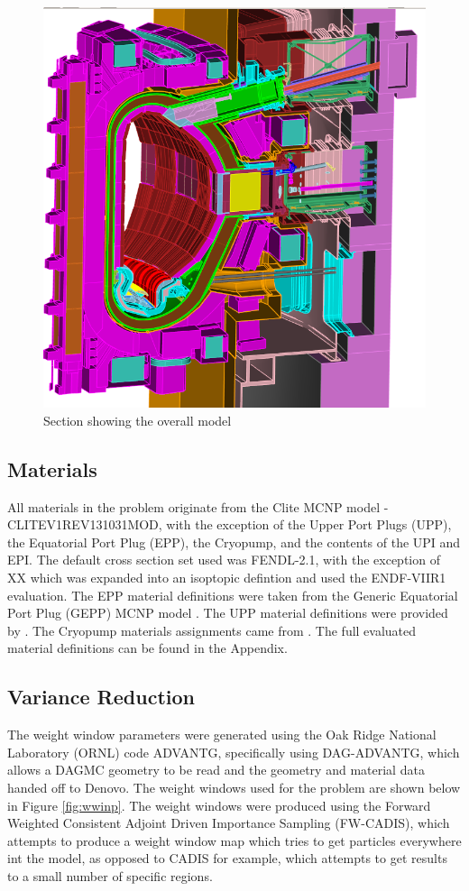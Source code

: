 \documentclass[12pt]{article}
\begin{document}
\begin{figure}[p]
  \centering
  \includegraphics[scale=0.8]{../plots/cad/global_zoom.png}
  \caption{Section showing the overall model}
  \label{fig:cad_iter_global_zoom}
\end{figure}

\subsection{Materials}
All materials in the problem originate from the Clite MCNP model - CLITE\textunderscore V1\textunderscore REV131031\textunderscore MOD, with the exception of the Upper Port Plugs (UPP), the Equatorial Port Plug (EPP), the Cryopump, and the contents of the UPI and EPI. The default cross section set used was FENDL-2.1, with the exception of XX which was expanded into an isoptopic defintion and used the ENDF-VIIR1 evaluation. The EPP material definitions were taken from the Generic Equatorial Port Plug (GEPP) MCNP model \cite{epp_materials}. The UPP material definitions were provided by \cite{bertalot_communication}. The Cryopump materials assignments came from \cite{cryopump_communication}. The full evaluated material definitions can be found in the Appendix.
\subsection{Variance Reduction}
The weight window parameters were generated using the Oak Ridge National Laboratory (ORNL) code ADVANTG, specifically using DAG-ADVANTG, which allows a DAGMC geometry to be read and the geometry and material data handed off to Denovo. The weight windows used
for the problem are shown below in Figure \ref{fig:wwinp}. The weight windows were produced using the Forward Weighted Consistent Adjoint Driven Importance Sampling (FW-CADIS), which attempts to produce a weight window map which tries to get particles everywhere int the model, as opposed to CADIS for example, which attempts to get results to a small number of specific regions.
\end{document}
